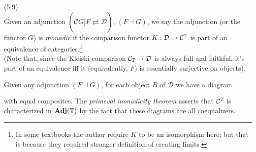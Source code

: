 \documentclass[a4paper]{article}
\begin{document}
\begin{defi} (5.9)\\
    Given an adjunction $(\mathcal{C} \stackrel[G]{F}{\rightleftarrows} \mathcal{D})$, $(F \dashv G)$, we say the adjunction (or the functor $G$) is \emph{monadic} if the comparison functor $K:\mathcal{D} \to \mathcal{C}^{\mathbb{T}}$ is part of an equivalence of categories.\footnote{In some textbooks the author require $K$ to be an isomorphism here; but that is because they required stronger definition of creating limits.}\\
    (Note that, since the Kleiski comparison $\mathcal{C}_{\mathbb{T}} \to\mathcal{D}$ is always full and faithful, it's part of an equivalence iff it (equivalently, $F$) is essentially surjective on objects).
\end{defi}

\begin{rem}
    Given any adjunction $(F \dashv G)$, for each object $B$ of $\mathcal{D}$ we have a diagram 
    with equal composites. The \emph{primeval monadicity theorem} asserts that $\mathcal{C}^{\mathbb{T}}$ is characterized in $\mathbf{Adj}(\mathbb{T})$ by the fact that these diagrams are all coequalizers.
\end{rem}
\end{document}
